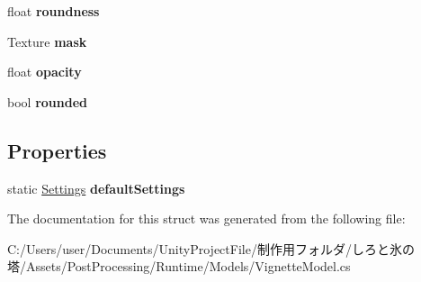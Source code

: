 \begin{DoxyCompactItemize}
float {\bfseries roundness}
\item 
\mbox{\label{struct_unity_engine_1_1_post_processing_1_1_vignette_model_1_1_settings_a7d929d4c446d91c488ced7f5fbbcc692}} 
Texture {\bfseries mask}
\item 
\mbox{\label{struct_unity_engine_1_1_post_processing_1_1_vignette_model_1_1_settings_a12f126ffbe9e86dce6a11d5f8313ace6}} 
float {\bfseries opacity}
\item 
\mbox{\label{struct_unity_engine_1_1_post_processing_1_1_vignette_model_1_1_settings_ac84a3387d5ffb33aea9fe2b7639ae402}} 
bool {\bfseries rounded}
\end{DoxyCompactItemize}
\subsection*{Properties}
\begin{DoxyCompactItemize}
\item 
\mbox{\label{struct_unity_engine_1_1_post_processing_1_1_vignette_model_1_1_settings_a7c1f4d2623dc2a4679a59de4c1d8ab11}} 
static \hyperlink{struct_unity_engine_1_1_post_processing_1_1_vignette_model_1_1_settings}{Settings} {\bfseries default\+Settings}
\end{DoxyCompactItemize}


The documentation for this struct was generated from the following file\+:\begin{DoxyCompactItemize}
\item 
C\+:/\+Users/user/\+Documents/\+Unity\+Project\+File/制作用フォルダ/しろと氷の塔/\+Assets/\+Post\+Processing/\+Runtime/\+Models/Vignette\+Model.\+cs\end{DoxyCompactItemize}
